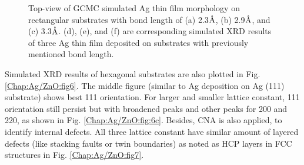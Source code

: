 \begin{figure}[!ht]
  \label{Chap:Ag/ZnO:fig:8f}
\caption[GCMC simulation and simulated XRD results of Ag thin film morphology on rectangular substrates.]{Top-view of \ac{GCMC} simulated Ag thin film morphology on rectangular substrates with bond length of (a) 2.3$\mbox{\normalfont\AA}$, (b) 2.9$\mbox{\normalfont\AA}$, and (c) 3.3$\mbox{\normalfont\AA}$. (d), (e), and (f) are corresponding simulated \ac{XRD} results of three Ag thin film  deposited on substrates with previously mentioned bond length.}
  \label{Chap:Ag/ZnO:fig8}
\end{figure}
\endgroup

Simulated \ac{XRD} results of hexagonal substrates are also plotted in Fig. \ref{Chap:Ag/ZnO:fig6}. The middle figure (similar to Ag deposition on Ag (111) substrate) shows best {111} orientation. For larger and smaller lattice constant, {111} orientation still persist but with broadened peaks and other peaks for {200} and {220}, as shown in Fig. \ref{Chap:Ag/ZnO:fig:6c}. Besides, \acf{CNA} \cite{kelton1991crystal} is also applied, to identify internal defects. All three lattice constant have similar amount of layered defects (like stacking faults or twin boundaries) as noted as \ac{HCP} layers in \ac{FCC} structures in Fig. \ref{Chap:Ag/ZnO:fig7}.

